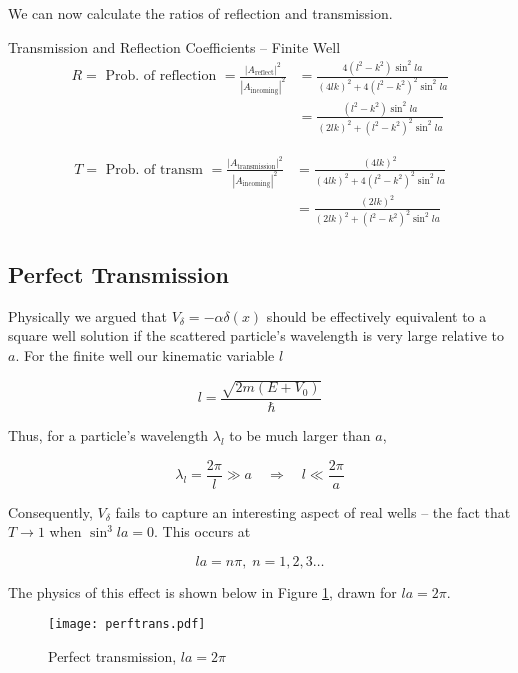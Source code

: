 We can now calculate the ratios of reflection and transmission. 

\begin{mainbox}{Transmission and Reflection Coefficients -- Finite Well}
  \begin{align} 
    R = \text{ Prob. of reflection } = \frac{|A_\text{reflect}
    |^2}{|A_\text{incoming} |^2} &= \frac{4(l^2 - k^2)\sin^2 la}{(4lk)^2 + 4(l^2
    -k^2)^2 \sin^2 la} \\ &= \frac{(l^2 - k^2) \sin^2 la}{(2lk)^2 + (l^2 - k^2)^2
    \sin^2 la}
  \end{align}

  \begin{align} \label{}
    T = \text{ Prob. of transm } = \frac{|A_\text{transmission}
    |^2}{|A_\text{incoming} |^2} &= \frac{(4lk)^2}{(4lk)^2 + 4(l^2 - k^2)^2
    \sin^2 la} \\ &= \frac{(2lk)^2}{(2lk)^2 + (l^2 - k^2)^2 \sin^2 la}
  \end{align}\vspace{3px}
\end{mainbox}


\subsection{Perfect Transmission} 

Physically we argued that $V_\delta = -\alpha\delta(x)$ should be effectively
equivalent to a square well solution if the scattered particle's 
wavelength is very large relative to $a$. For the finite well our kinematic variable $ l$

\[
l = \frac{\sqrt{2m(E+V_0)}}{\hbar}
\] \vspace{3px}

Thus, for a particle's wavelength $\lambda_l$ to be much larger than $a$, 

\[
\lambda_l = \frac{2\pi}{l} \gg a \quad \Rightarrow \quad l \ll \frac{2\pi}{a}
\] \vspace{3px}

Consequently, $V_\delta$ fails to capture an interesting aspect of real wells
-- the fact that $T \rightarrow 1$ when $\sin^3 la = 0$. This occurs at 

\[
la = n\pi, \; n = 1,2,3 \hdots
\] \vspace{3px}

The physics of this effect is shown below in Figure \ref{perftrans}, drawn for
$la = 2\pi$. 


\begin{figure}[H]
  \centering
    \texttt{[image: perftrans.pdf]}
    \caption{Perfect transmission, $la = 2\pi$ } 
    \label{perftrans}
\end{figure}

